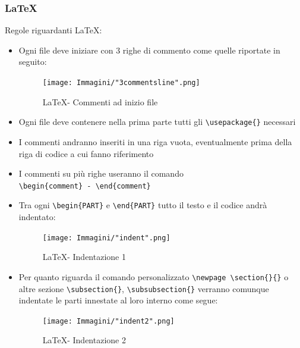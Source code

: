 \documentclass[a4paper]{article}
\begin{document}
		\subsubsection{\LaTeX}
		Regole riguardanti \LaTeX :
		\begin{itemize}
			\item Ogni file deve iniziare con 3 righe di commento come quelle riportate in seguito:
			\begin{figure}[H]
				\centering
				\texttt{[image: Immagini/"3commentsline".png]}
				\caption{\LaTeX \space - Commenti ad inizio file}
			\end{figure}
			\item Ogni file deve contenere nella prima parte tutti gli \verb|\usepackage{}| necessari
			\item I commenti andranno inseriti in una riga vuota, eventualmente prima della riga di
			codice a cui fanno riferimento
			\item I commenti su più righe useranno il comando \\ \verb|\begin{comment} - \end{comment}|
			\item Tra ogni \verb|\begin{PART}| e \verb|\end{PART}| tutto il testo e il codice andrà indentato:
			\begin{figure}[H]
				\centering
				\texttt{[image: Immagini/"indent".png]}
				\caption{\LaTeX \space - Indentazione 1}
			\end{figure}
			\item Per quanto riguarda il comando personalizzato \verb|\newpage \section{}{}| o altre sezione \verb|\subsection{}|, \verb|\subsubsection{}|
			verranno comunque indentate le parti innestate al loro interno come segue:
			\begin{figure}[H]
				\centering
				\texttt{[image: Immagini/"indent2".png]}
				\caption{\LaTeX \space - Indentazione 2}
			\end{figure}

\end{itemize}
\end{document}
